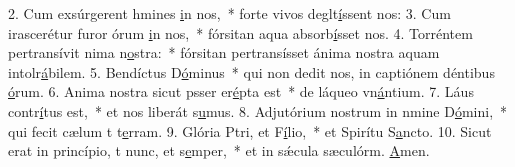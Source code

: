 2. Cum exsúrgerent hmines \uline{i}n nos,~* forte vivos deglt\uline{í}ssent nos:
3. Cum irascerétur furor órum \uline{i}n nos,~* fórsitan aqua absorb\uline{í}sset nos.
4. Torréntem pertransívit nima n\uline{o}stra:~* fórsitan pertransísset ánima nostra aquam intolr\uline{á}bilem.
5. Bendíctus D\uline{ó}minus~* qui non dedit nos, in captiónem déntibus \uline{ó}rum.
6. Anima nostra sicut psser er\uline{é}pta est~* de láqueo vn\uline{á}ntium.
7. Láus contr\uline{í}tus est,~* et nos liberát s\uline{u}mus.
8. Adjutórium nostrum in nmine D\uline{ó}mini,~* qui fecit cælum t t\uline{e}rram.
9. Glória Ptri, et F\uline{í}lio,~* et Spirítu S\uline{a}ncto.
10. Sicut erat in princípio, t nunc, et s\uline{e}mper,~* et in sǽcula sæculórm. \uline{A}men.
